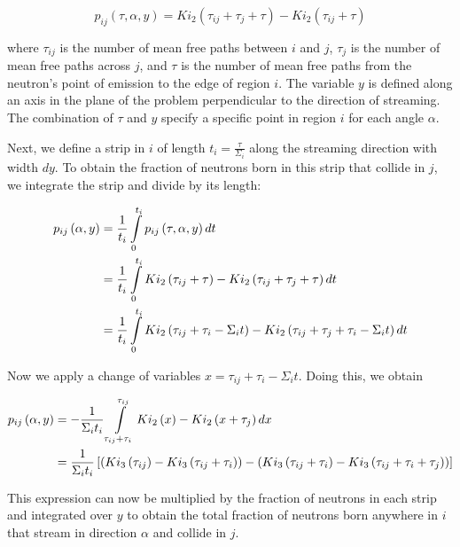 \begin{equation}\label{e:CPpTauAlphaY}
p_{ij}\left(\tau, \alpha, y\right) = Ki_2\left(\tau_{ij} + \tau_j + \tau\right) - Ki_2\left(\tau_{ij} + \tau\right)
\end{equation}

where $\tau_{ij}$ is the number of mean free paths between $i$ and $j$, $\tau_j$ is the number of mean free paths across $j$, and $\tau$ is the number of mean free paths from the neutron's point of emission to the edge of region $i$.  The variable $y$ is defined along an axis in the plane of the problem perpendicular to the direction of streaming.  The combination of $\tau$ and $y$ specify a specific point in region $i$ for each angle $\alpha$.

Next, we define a strip in $i$ of length $t_i = \frac{\tau}{\Sigma_i}$ along the streaming direction with width $dy$.  To obtain the fraction of neutrons born in this strip that collide in $j$, we integrate the strip and divide by its length:

\begin{align}
p_{ij}\left(\alpha, y\right) &= \frac{1}{t_i} \intop_0^{t_i} p_{ij}\left(\tau, \alpha, y\right) dt \nonumber \\
&= \frac{1}{t_i} \intop_0^{t_i} Ki_2\left(\tau_{ij} + \tau\right) - Ki_2\left(\tau_{ij} + \tau_j + \tau\right) dt \nonumber \\
&= \frac{1}{t_i} \intop_0^{t_i} Ki_2\left(\tau_{ij} + \tau_i - \Sigma_i t\right) - Ki_2\left(\tau_{ij} + \tau_j + \tau_i - \Sigma_i t\right) dt
\end{align}

Now we apply a change of variables $x=\tau_{ij} + \tau_i - \Sigma_i t$.  Doing this, we obtain

\begin{align}
p_{ij}\left(\alpha, y\right) &= -\frac{1}{\Sigma_i t_i} \intop_{\tau_{ij} + \tau_i}^{\tau_{ij}} Ki_2\left(x\right) - Ki_2\left(x + \tau_j\right) dx \nonumber \\
&= \frac{1}{\Sigma_i t_i} \left[\left(Ki_3\left(\tau_{ij}\right) - Ki_3\left(\tau_{ij} + \tau_i\right)\right) - \left(Ki_3\left(\tau_{ij} + \tau_i\right) - Ki_3\left(\tau_{ij} + \tau_i + \tau_j\right)\right)\right]
\end{align}

This expression can now be multiplied by the fraction of neutrons in each strip and integrated over $y$ to obtain the total fraction of neutrons born anywhere in $i$ that stream in direction $\alpha$ and collide in $j$.

